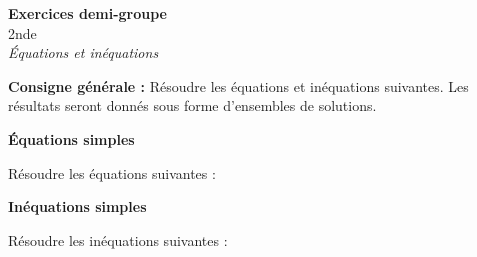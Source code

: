 \documentclass[12pt]{exam}
\begin{document}
\begin{center}
    {\Large \textbf{Exercices demi-groupe}}\\[2mm]
    {\large 2nde}\\[2mm]
    \textit{Équations et inéquations}
\end{center}

\vspace{0.3cm}

\textbf{Consigne générale :}  
Résoudre les équations et inéquations suivantes. Les résultats seront donnés sous forme d’ensembles de solutions.

\vspace{0.4cm}

\begin{questions}

\question \textbf{Équations simples}

Résoudre les équations suivantes :

\vspace{0.5cm}

\question \textbf{Inéquations simples}

Résoudre les inéquations suivantes :


\end{questions}
\end{document}
